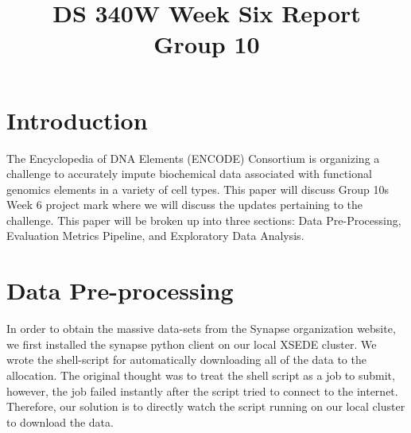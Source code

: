 \documentclass[conference]{IEEEtran}
\begin{document}
\title{DS 340W Week Six Report\\
{\footnotesize Group 10}
}

\author{
\and
{}
}

\maketitle



\section{Introduction}
The Encyclopedia of DNA Elements (ENCODE) Consortium is organizing a challenge to accurately impute biochemical data associated with functional genomics elements in a variety of cell types. This paper will discuss Group 10s Week 6 project mark where we will discuss the updates pertaining to the challenge. This paper will be broken up into three sections: Data Pre-Processing, Evaluation Metrics Pipeline, and Exploratory Data Analysis. 

\section{Data Pre-processing}
In order to obtain the massive data-sets from the Synapse organization website, we first installed the synapse python client on our local XSEDE cluster. We wrote the shell-script for automatically downloading all of the data to the allocation. The original thought was to treat the shell script as a job to submit, however, the job failed instantly after the script tried to connect to the internet. Therefore, our solution is to directly watch the script running on our local cluster to download the data. 
\end{document}
